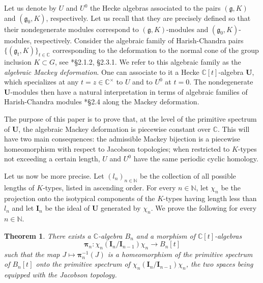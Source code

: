 \documentclass{amsart}
\newtheorem{theoremintro}{Theorem}
\theoremstyle{definition}
\begin{document}
Let us denote by $U$ and $U^0$ the Hecke algebras associated to the pairs $(\mathfrak{g},K)$ and $(\mathfrak{g}_0,K)$, respectively. Let us recall that they are precisely defined so that their nondegenerate modules correspond to $(\mathfrak{g},K)$-modules and $(\mathfrak{g}_0,K)$-modules, respectively. Consider the algebraic family of Harish-Chandra pairs $\{(\mathfrak{g}_t,K)\}_{t \in \mathbb{C}}$ corresponding to the deformation to the normal cone of the group inclusion $K\subset G$, see \cite{BHS}*{§2.1.2, §2.3.1}. We refer to this algebraic family as the \textit{algebraic Mackey deformation}. One can associate to it a Hecke $\mathbb{C}[t]$-algebra $\bm{U}$, which specializes at any $t=z \in \mathbb{C}^\times$ to $U$ and to $U^0$ at $t=0$. The nondegenerate $\bm{U}$-modules then have a natural interpretation in terms of algebraic families of Harish-Chandra modules \cite{BHS}*{§2.4} along the Mackey deformation.

The purpose of this paper is to prove that, at the level of the primitive spectrum of $\bm{U}$, the algebraic Mackey deformation is piecewise constant over $\mathbb{C}$. This will have two main consequences: the admissible Mackey bijection is a piecewise homeomorphism with respect to Jacobson topologies; when restricted to $K$-types not exceeding a certain length, $U$ and $U^0$ have the same periodic cyclic homology.

Let us now be more precise. Let $(l_n)_{n \in \mathbb{N}}$ be the collection of all possible lengths of $K$-types, listed in ascending order. For every $n \in \mathbb{N}$, let $\chi_n$ be the projection onto the isotypical components of the $K$-types having length less than $l_n$ and let $\bm{I}_n$ be the ideal of $\bm{U}$ generated by $\chi_n$. We prove the following for every $n\in \mathbb{N}$.

\begin{theoremintro}\label{maintheorem}
    There exists a $\mathbb{C}$-algebra $B_n$ and a morphism of $\mathbb{C}[t]$-algebras
    \[\bm{\pi}_n : \chi_n (\bm{I}_n/\bm{I}_{n-1})\chi_n \longrightarrow  B_n[t]\]
    such that the map $J \mapsto \bm{\pi}^{-1}_n(J)$ is a homeomorphism of the primitive spectrum of $B_n[t]$ onto the primitive spectrum of $\chi_n (\bm{I}_n/\bm{I}_{n-1})\chi_n$, the two spaces being equipped with the Jacobson topology.
\end{theoremintro}
\end{document}
